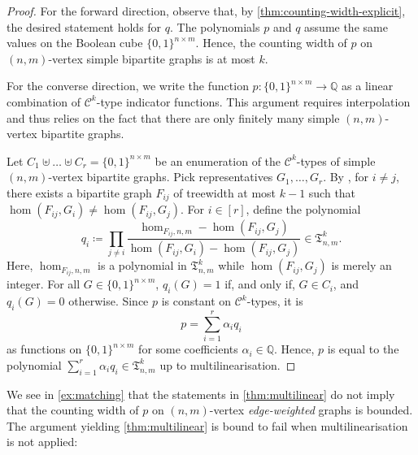 \documentclass[11pt, DIV=15]{scrarticle}
\theoremstyle{definition}
\theoremstyle{plain}
\theoremstyle{remark}
\begin{document}
	\begin{proof}
		For the forward direction, observe that, by \cref{thm:counting-width-explicit},
		the desired statement holds for $q$.
		The polynomials $p$ and $q$ assume the same values on the Boolean cube $\{0,1\}^{n \times m}$.
		Hence, the counting width of $p$ on $(n,m)$-vertex simple bipartite graphs is at most $k$.
		
		For the converse direction,
		we write the function $p \colon \{0,1\}^{n\times m} \to \mathbb{Q}$ as a linear combination of $\mathcal{C}^k$-type indicator functions.
		This argument requires interpolation and thus relies on the fact that there are only finitely many simple $(n,m)$-vertex bipartite graphs.
		
		Let $C_1 \uplus \dots \uplus C_r = \{0,1\}^{n\times m}$ be an enumeration of the $\mathcal{C}^k$-types of simple $(n,m)$-vertex bipartite graphs.
		Pick representatives $G_1, \dots, G_r$.
		By \cite{dvorak_recognizing_2010},
		for $i \neq j$, there  exists a bipartite graph $F_{ij}$ of treewidth at most $k-1$ such that $\hom(F_{ij}, G_i) \neq \hom(F_{ij}, G_j)$.
		For $i \in [r]$, define the polynomial
		\[
			q_i\coloneqq \prod_{j \neq i} \frac{\hom_{F_{ij}, n,m} - \hom(F_{ij}, G_j)}{\hom(F_{ij}, G_i) - \hom(F_{ij}, G_j)} \in \mathfrak{T}^k_{n,m}.
		\]
		Here, $\hom_{F_{ij}, n,m}$ is a polynomial in $\mathfrak{T}^k_{n,m}$ while $\hom(F_{ij}, G_j)$ is merely an integer.
		For all $G \in \{0,1\}^{n\times m}$, $q_i(G) = 1$ if, and only if, $G \in C_i$, and $q_i(G) =0$ otherwise.
		Since $p$ is constant on $\mathcal{C}^k$-types,
		it is
		\[
			p = \sum_{i=1}^r \alpha_i q_i
		\]
		as functions on $\{0,1\}^{n\times m}$ for some coefficients $\alpha_i \in \mathbb{Q}$.
		Hence, $p$ is equal to the polynomial $\sum_{i=1}^r \alpha_i q_i \in \mathfrak{T}^k_{n,m}$ up to multilinearisation.
	\end{proof}
	We see in \cref{ex:matching} that the statements in \cref{thm:multilinear} do not imply that the counting width of $p$ on $(n,m)$-vertex \emph{edge-weighted} graphs is bounded.
	The argument yielding \cref{thm:multilinear} is bound to fail when multilinearisation is not applied:
\end{document}
